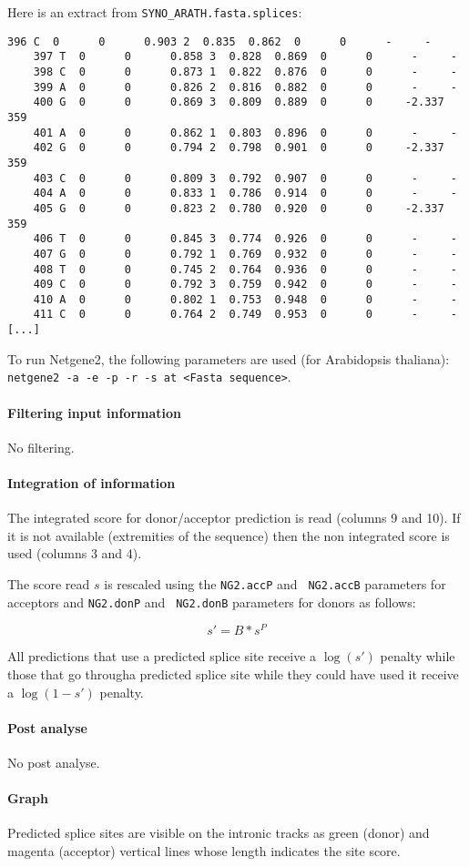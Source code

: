 Here is an extract from \texttt{SYNO\_ARATH.fasta.splices}:
\begin{Verbatim}[fontsize=\small]
    396 C  0      0      0.903 2  0.835  0.862  0      0      -     - 
    397 T  0      0      0.858 3  0.828  0.869  0      0      -     - 
    398 C  0      0      0.873 1  0.822  0.876  0      0      -     - 
    399 A  0      0      0.826 2  0.816  0.882  0      0      -     - 
    400 G  0      0      0.869 3  0.809  0.889  0      0     -2.337 359 
    401 A  0      0      0.862 1  0.803  0.896  0      0      -     - 
    402 G  0      0      0.794 2  0.798  0.901  0      0     -2.337 359 
    403 C  0      0      0.809 3  0.792  0.907  0      0      -     - 
    404 A  0      0      0.833 1  0.786  0.914  0      0      -     - 
    405 G  0      0      0.823 2  0.780  0.920  0      0     -2.337 359 
    406 T  0      0      0.845 3  0.774  0.926  0      0      -     - 
    407 G  0      0      0.792 1  0.769  0.932  0      0      -     - 
    408 T  0      0      0.745 2  0.764  0.936  0      0      -     - 
    409 C  0      0      0.792 3  0.759  0.942  0      0      -     - 
    410 A  0      0      0.802 1  0.753  0.948  0      0      -     - 
    411 C  0      0      0.764 2  0.749  0.953  0      0      -     - 
[...]
\end{Verbatim}

To run Netgene2, the following parameters are used (for Arabidopsis
thaliana): \texttt{netgene2 -a -e -p -r -s at <Fasta sequence>}.

\paragraph{Filtering input information}

No filtering.

\paragraph{Integration of information}

The integrated score for donor/acceptor prediction is read (columns 9
and 10). If it is not available (extremities of the sequence) then the
non integrated score is used (columns 3 and 4).

The score read $s$ is rescaled using the {\tt NG2.accP} and {\tt
NG2.accB} parameters for acceptors and {\tt NG2.donP} and {\tt
NG2.donB} parameters for donors as follows:

\[s' = B*s^P\]

All predictions that use a predicted splice site receive a $\log(s')$
penalty while those that go througha predicted splice site while they
could have used it receive a $\log(1-s')$ penalty.


\paragraph{Post analyse}

No post analyse.

\paragraph{Graph}

Predicted splice sites are visible on the intronic tracks as green
(donor) and magenta (acceptor) vertical lines whose length indicates
the site score.




